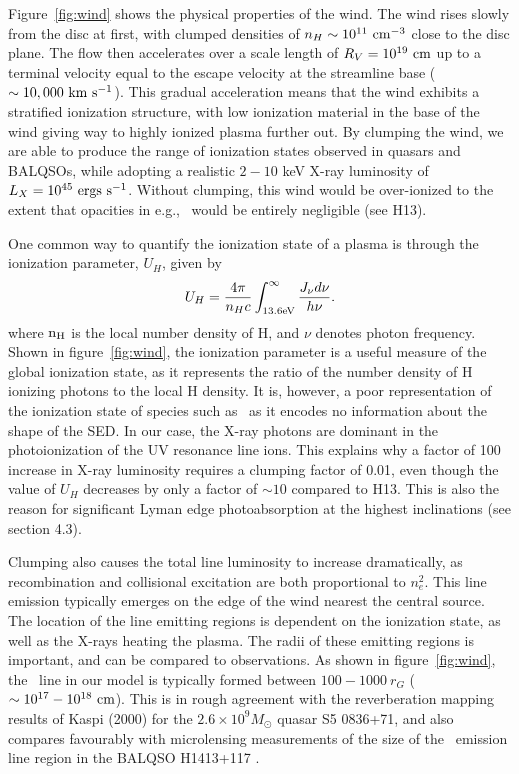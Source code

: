 \documentclass[preprint, a4paper, 11pt]{aastex}
\begin{document}
Figure~\ref{fig:wind} shows the physical properties of the wind.
The wind rises slowly from the disc at first, with clumped densities
of $n_H \sim 10^{11}~\rm{cm^{-3}}$ close to the disc plane.
The flow then accelerates over a scale length of $R_V=10^{19}~\rm{cm}$
up to a terminal velocity equal to the escape velocity at the streamline base
($\sim10,000~\rm{km~s^{-1}}$). This gradual acceleration means that
the wind exhibits a stratified ionization structure, with low ionization material
in the base of the wind giving way to highly ionized plasma further out.
By clumping the wind, we are able to produce the range of ionization states observed
in quasars and BALQSOs, while adopting a realistic $2-10$ keV X-ray luminosity
of $L_{X}=10^{45}~\rm{ergs~s^{-1}}$. Without clumping, this wind would be over-ionized 
to the extent that opacities in e.g., \civ\ would be entirely negligible (see H13).

One common way to quantify the ionization state of a plasma
is through the ionization parameter, $U_H$, given by
\begin{equation}
U_H = \frac{4\pi}{n_H c}\int_{13.6{\rm{eV}}}^{\infty}\frac{{J_{\nu}d\nu}}{h\nu}.
\end{equation}
\noindent where $\rm{n_H}$ is the local number density of H, and $\nu$ denotes photon 
frequency. Shown in figure~\ref{fig:wind},
the ionization parameter is a useful measure of the global ionization state,
as it represents the ratio of the number density of 
H ionizing photons to the local H density.
It is, however, a poor representation of the 
ionization state of species such as \civ\ as it encodes no information
about the shape of the SED. In our case, the X-ray photons 
are dominant in the photoionization of the UV resonance line ions. 
This explains why a factor of 100 increase in X-ray luminosity requires
a clumping factor of 0.01, even though the value of $U_H$ decreases by only a factor of $\sim10$ 
compared to H13. This is also the reason for significant Lyman edge photoabsorption
at the highest inclinations (see section 4.3).

Clumping also causes the total line luminosity to increase dramatically,
as recombination and collisional excitation are both proportional to
$n_e^2$. This line emission typically emerges on the edge of the wind
nearest the central source. The location of the line emitting regions
is dependent on the ionization state, as well as the X-rays heating the plasma.
The radii of these emitting regions is important,
and can be compared to observations. As shown in figure~\ref{fig:wind},
the \civ\ line in our model is typically formed between 
$100-1000~r_G$ ($\sim10^{17}-10^{18}~\rm{cm}$).
This is in rough agreement with the reverberation mapping 
results of Kaspi (2000) for the $2.6\times10^{9} M_\odot$ quasar S5 0836+71,
and also compares favourably with microlensing measurements of the size of the
\civ\ emission line region in the BALQSO H1413+117 \citep{odowd2015}.
\end{document}
